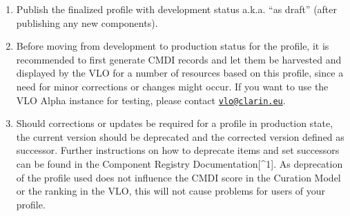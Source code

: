 \documentclass[]{article}
\providecommand{\tightlist}{%
  \setlength{\itemsep}{0pt}\setlength{\parskip}{0pt}}
\begin{document}
\begin{enumerate}
\def\labelenumi{\arabic{enumi}.}
\setcounter{enumi}{4}
\tightlist
\item
  Publish the finalized profile with development status a.k.a. ``as
  draft'' (after publishing any new components).
\item
  Before moving from development to production status for the profile,
  it is recommended to first generate CMDI records and let them be
  harvested and displayed by the VLO for a number of resources based on
  this profile, since a need for minor corrections or changes might
  occur. If you want to use the VLO Alpha instance for testing, please
  contact \href{mailto:vlo@clarin.eu}{\nolinkurl{vlo@clarin.eu}}.
\item
  Should corrections or updates be required for a profile in production
  state, the current version should be deprecated and the corrected
  version defined as successor. Further instructions on how to deprecate
  items and set successors can be found in the Component Registry
  Documentation{[}\^{}1{]}. As deprecation of the profile used does not
  influence the CMDI score in the Curation Model or the ranking in the
  VLO, this will not cause problems for users of your profile.
\end{enumerate}
\end{document}
